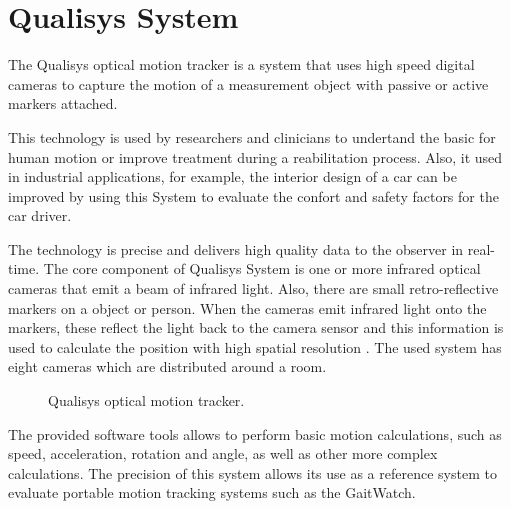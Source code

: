 \section{Qualisys System}
The Qualisys optical motion tracker is a system that uses high speed digital cameras to capture the motion of a measurement object with passive or active markers attached.  \cite{OlivaresBotzel2013}

This technology is used by researchers and clinicians to undertand the basic for human motion or improve treatment during a reabilitation process. Also, it used in industrial applications, for example, the interior design of a car can be improved by using this System to evaluate the confort and safety factors for the car driver. \cite{Qualisys}

The technology is precise and delivers high quality data to the observer in real-time. The core component of Qualisys System is one or more infrared optical cameras that emit a beam of infrared light. Also, there are small retro-reflective markers on a object or person. When the cameras emit infrared light onto the markers, these reflect the light back to the camera sensor and this information is used to calculate the position with high spatial resolution  \cite{Qualisys}. The used system has eight cameras which are distributed around a room.

\begin{figure}[H]
	\centering
	\caption{Qualisys optical motion tracker.}
	\label{fig:arte1}
\end{figure}

The provided software tools allows to perform basic motion calculations,
such as speed, acceleration, rotation and angle, as well as other more complex
calculations. The precision of this system allows its use as a reference system to evaluate portable motion tracking systems such as the GaitWatch.  \cite{OlivaresBotzel2013}
